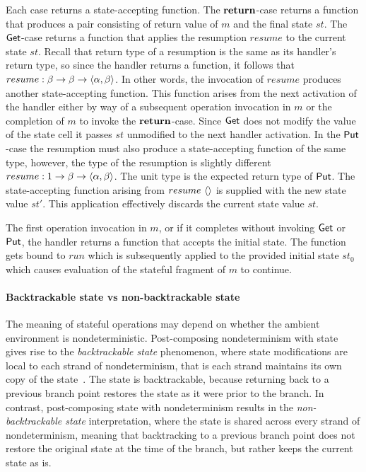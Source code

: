 \documentclass[12pt,phd,lfcs,twoside,openright,logo,leftchapter,normalheadings]{infthesis}
\theoremstyle{plain}
\theoremstyle{definition}
\begin{document}
%
Each case returns a state-accepting function.
%
The $\mathbf{return}$-case returns a function that produces a pair consisting
of return value of $m$ and the final state $st$.
%
The $\mathsf{Get}$-case returns a function that applies the resumption
$resume$ to the current state $st$. Recall that return type of a
resumption is the same as its handler's return type, so since the
handler returns a function, it follows that
$resume : \beta \to \beta \to \langle \alpha, \beta \rangle$. In other words,
the invocation of $resume$ produces another state-accepting
function. This function arises from the next activation of the handler
either by way of a subsequent operation invocation in $m$ or the
completion of $m$ to invoke the $\mathbf{return}$-case. Since $\mathsf{Get}$ does not
modify the value of the state cell it passes $st$ unmodified to the
next handler activation.
%
In the $\mathsf{Put}$-case the resumption must also produce a state-accepting
function of the same type, however, the type of the resumption is
slightly different
$resume : 1 \to \beta \to \langle \alpha, \beta \rangle$. The unit
type is the expected return type of $\mathsf{Put}$. The state-accepting
function arising from $resume~\langle  \rangle$ is supplied with the new state
value $st'$. This application effectively discards the current state
value $st$.

The first operation invocation in $m$, or if it completes without
invoking $\mathsf{Get}$ or $\mathsf{Put}$, the handler returns a function that accepts
the initial state. The function gets bound to $run$ which is
subsequently applied to the provided initial state $st_0$ which causes
evaluation of the stateful fragment of $m$ to continue.

\paragraph{Backtrackable state vs non-backtrackable state} The meaning
of stateful operations may depend on whether the ambient environment
is nondeterministic.  Post-composing nondeterminism with state gives
rise to the \emph{backtrackable state} phenomenon, where state
modifications are local to each strand of nondeterminism, that is each
strand maintains its own copy of the state~\cite{GibbonsH11}. The
state is backtrackable, because returning back to a previous branch
point restores the state as it were prior to the branch. In contrast,
post-composing state with nondeterminism results in the
\emph{non-backtrackable state} interpretation, where the state is
shared across every strand of nondeterminism, meaning that
backtracking to a previous branch point does not restore the original
state at the time of the branch, but rather keeps the current state as
is.
\end{document}
